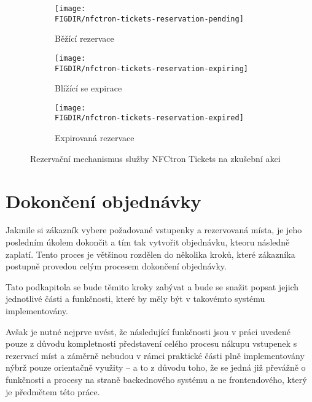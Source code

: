 \begin{figure}[H]
    \centering
    \begin{subfigure}{0.3\textwidth}
        \texttt{[image: \\FIGDIR/nfctron-tickets-reservation-pending]}
        \caption{Běžící rezervace}
        \label{fig:nfctron-tickets-reservation-pending}
    \end{subfigure}
    \hfill
    \begin{subfigure}{0.3\textwidth}
        \texttt{[image: \\FIGDIR/nfctron-tickets-reservation-expiring]}
        \caption{Blížící se expirace}
        \label{fig:nfctron-tickets-reservation-expiring}
    \end{subfigure}
    \hfill
    \begin{subfigure}{0.3\textwidth}
        \texttt{[image: \\FIGDIR/nfctron-tickets-reservation-expired]}
        \caption{Expirovaná rezervace}
        \label{fig:nfctron-tickets-reservation-expired}
    \end{subfigure}

    \caption{Rezervační mechanismus služby NFCtron Tickets na zkušební akci}
    \label{fig:nfctron-tickets-reservation}
\end{figure}

\section{Dokončení objednávky}
\label{sec:specifikace-dokonceni-objednavky}
Jakmile si zákazník vybere požadované vstupenky a rezervovaná místa, je jeho posledním úkolem dokončit a tím tak vytvořit objednávku, kteoru následně zaplatí.
Tento proces je většinou rozdělen do několika kroků, které zákazníka postupně provedou celým procesem dokončení objednávky.

Tato podkapitola se bude těmito kroky zabývat a bude se snažit popsat jejich jednotlivé části a funkčnosti, které by měly být v takovémto systému implementovány.

Avšak je nutné nejprve uvést, že následující funkčnosti jsou v práci uvedené pouze z důvodu kompletnosti představení celého procesu nákupu vstupenek s rezervací míst a záměrně nebudou v rámci praktické části plně implementovány nýbrž pouze orientačně využity – a to z důvodu toho, že se jedná již převážně o funkčnosti a procesy na straně backednového systému a ne frontendového, který je předmětem této práce.

